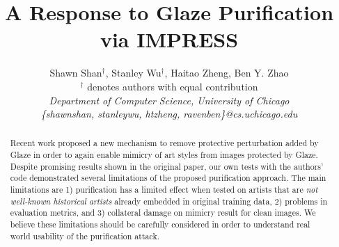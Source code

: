 \documentclass[sigconf]{acmart}
\begin{document}
\title{A Response to Glaze Purification via IMPRESS}

\author{Shawn Shan$^\dag$, Stanley Wu$^\dag$, Haitao Zheng, Ben Y. Zhao\\
$^\dag$ denotes authors with equal contribution\\
  {\em Department of Computer Science, University of Chicago}\\
  {\em \{shawnshan, stanleywu, htzheng, ravenben\}@cs.uchicago.edu}}

\begin{abstract}

  Recent work proposed a new mechanism to remove protective perturbation
  added by Glaze in order to again enable mimicry of art styles from images
  protected by Glaze.  Despite promising results shown in the original paper,
  our own tests with the authors' code demonstrated several limitations of
  the proposed purification approach.  The main limitations are 1)
  purification has a limited effect when tested on artists that are \textit{not
    well-known historical artists} already embedded in original training
  data, 2) problems in evaluation metrics, and 3) 
  collateral damage on mimicry result for clean images.  We believe these
  limitations should be carefully considered in order to understand real
  world usability of the purification attack.

\end{abstract}

\maketitle








\balance
\end{document}
